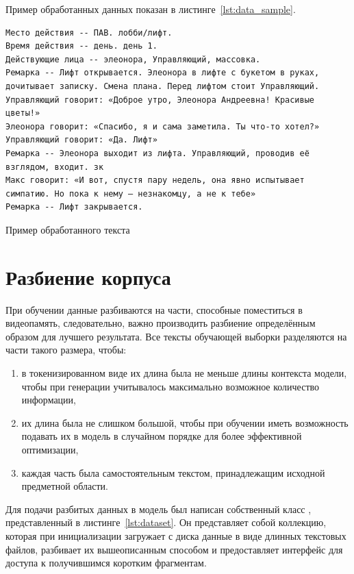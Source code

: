 Пример обработанных данных показан в листинге \ref*{lst:data_sample}.

\begin{listing}[H]
\begin{verbatim}
Место действия -- ПАВ. лобби/лифт. 
Время действия -- день. день 1. 
Действующие лица -- элеонора, Управляющий, массовка. 
Ремарка -- Лифт открывается. Элеонора в лифте с букетом в руках,
дочитывает записку. Смена плана. Перед лифтом стоит Управляющий. 
Управляющий говорит: «Доброе утро, Элеонора Андреевна! Красивые
цветы!»
Элеонора говорит: «Спасибо, я и сама заметила. Ты что-то хотел?» 
Управляющий говорит: «Да. Лифт» 
Ремарка -- Элеонора выходит из лифта. Управляющий, проводив её
взглядом, входит. зк 
Макс говорит: «И вот, спустя пару недель, она явно испытывает
симпатию. Но пока к нему – незнакомцу, а не к тебе» 
Ремарка -- Лифт закрывается. 
\end{verbatim}
\caption{Пример обработанного текста}
\label{lst:data_sample}
\end{listing}

\section{Разбиение корпуса}

При обучении данные разбиваются на части, способные поместиться в видеопамять, следовательно, важно производить разбиение определённым образом для лучшего результата. Все тексты обучающей выборки разделяются на части такого размера, чтобы:
\begin{enumerate}
    \item в токенизированном виде их длина была не меньше длины контекста модели, чтобы при генерации учитывалось максимально возможное количество информации,
    \item их длина была не слишком большой, чтобы при обучении иметь возможность подавать их в модель в случайном порядке для более эффективной оптимизации,
    \item каждая часть была самостоятельным текстом, принадлежащим исходной предметной области.
\end{enumerate}

Для подачи разбитых данных в модель был написан собственный класс , представленный в листинге \ref*{lst:dataset}. Он представляет собой коллекцию, которая при инициализации загружает с диска данные в виде длинных текстовых файлов, разбивает их вышеописанным способом и предоставляет интерфейс для доступа к получившимся коротким фрагментам.

